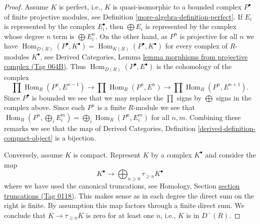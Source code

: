 \documentclass{amsart}
\theoremstyle{plain}
\theoremstyle{definition}
\theoremstyle{remark}
\numberwithin{equation}{subsection}
\def\Hom{\mathop{\mathrm{Hom}}\nolimits}
\begin{document}
\begin{proof}
Assume $K$ is perfect, i.e., $K$ is quasi-isomorphic to a bounded complex
$P^\bullet$ of finite projective modules, see
Definition \ref{more-algebra-definition-perfect}. If $E_i$ is represented by the complex
$E_i^\bullet$, then $\bigoplus E_i$ is represented by the complex
whose degree $n$ term is $\bigoplus E_i^n$. On the other hand,
as $P^n$ is projective for all $n$ we have
$\Hom_{D(R)}(P^\bullet, K^\bullet) = \Hom_{K(R)}(P^\bullet, K^\bullet)$
for every complex of $R$-modules $K^\bullet$, see
Derived Categories,
Lemma \href{https://stacks.math.columbia.edu/tag/064B}{lemma morphisms from projective complex (Tag 064B)}.
Thus $\Hom_{D(R)}(P^\bullet, E^\bullet)$ is the cohomology of the complex
$$
\prod \Hom_R(P^n, E^{n - 1}) \to
\prod \Hom_R(P^n, E^n) \to
\prod \Hom_R(P^n, E^{n + 1}).
$$
Since $P^\bullet$ is bounded we see that we may replace the $\prod$
signs by $\bigoplus$ signs in the complex above. Since each $P^n$ is a finite
$R$-module we see that
$\Hom_R(P^n, \bigoplus_i E_i^m) = \bigoplus_i \Hom_R(P^n, E_i^m)$
for all $n, m$.
Combining these remarks we see that the map of
Derived Categories, Definition \ref{derived-definition-compact-object}
is a bijection.

\medskip\noindent
Conversely, assume $K$ is compact.
Represent $K$ by a complex $K^\bullet$ and consider the map
$$
K^\bullet
\longrightarrow
\bigoplus\nolimits_{n \geq 0} \tau_{\geq n} K^\bullet
$$
where we have used the canonical truncations, see
Homology, Section \href{https://stacks.math.columbia.edu/tag/0118}{section truncations (Tag 0118)}.
This makes sense as in each degree the direct sum on the right is finite.
By assumption this map factors through a finite direct sum.
We conclude that $K \to \tau_{\geq n} K$ is zero for at least one $n$,
i.e., $K$ is in $D^{-}(R)$.


\end{proof}
\end{document}
